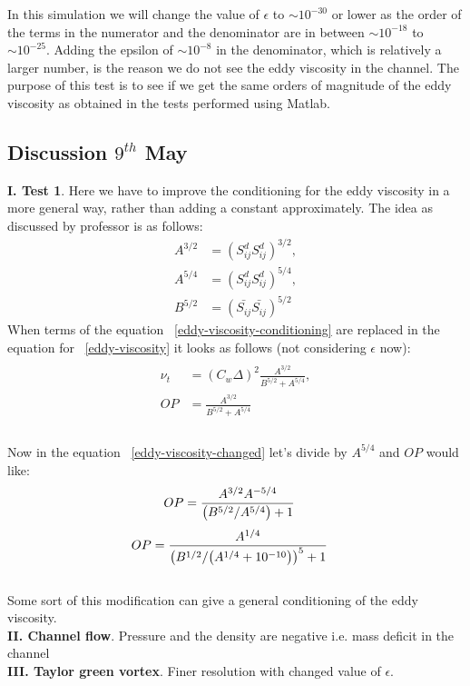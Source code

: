\documentclass[a4paper]{article}
\def\sij{\bar{S_{ij}}}
\begin{document}
In this simulation we will change the value of $\epsilon$ to $\sim 10^{-30}$ or lower as the order of the terms in the numerator and the denominator are in between $\sim 10^{-18}$ to $\sim 10^{-25}$. Adding the epsilon of $\sim 10^{-8}$ in the denominator, which is relatively a larger number, is the reason we do not see the eddy viscosity in the channel. The purpose of this test is to see if we get the same orders of magnitude of the eddy viscosity as obtained in the tests performed using Matlab.
\subsection{Discussion $9^{th}$ May}

{\bf I. Test 1}. Here we have to improve the conditioning for the eddy viscosity in a more general way, rather than adding a constant  approximately. The idea as discussed by professor is as follows:
\begin{equation}
\label{eddy-viscosity-conditioning}
\begin{split}
A^{3/2} &= \left({S_{ij}^{d}}{S_{ij}^{d}}\right)^{3/2},\\
A^{5/4} &= \left({S_{ij}^{d}}{S_{ij}^{d}}\right)^{5/4},\\
B^{5/2} &= \left(\sij \sij\right)^{5/2}
\end{split}
\end{equation}
When terms of the equation ~\ref{eddy-viscosity-conditioning} are replaced in the equation for ~\ref{eddy-viscosity} it looks as follows (not considering $\epsilon$ now):
\begin{equation}
\label{eddy-viscosity-changed}
\begin{split}\\
{\nu_t} &= \left({C_w}{\Delta}\right)^{2}
\frac{A^{3/2}}{B^{5/2} + {A^{5/4}}},\\
{OP} &= \frac{A^{3/2}}{B^{5/2} + {A^{5/4}}}\\
\end{split}
\end{equation}\\
Now in the equation ~\ref{eddy-viscosity-changed} let's divide by ${A^{5/4}}$ and ${OP}$ would like:
\begin{equation}
\begin{split}
{OP} &= \frac{A^{3/2}A^{\--5/4}}{\left(B^{5/2}\// {A^{5/4}}\right) + 1}
\end{split}
\end{equation}
\begin{equation}
\label{some_modification}
\begin{split}
{OP} &= \frac{A^{1/4}}{\left(B^{1/2}\// {\left(A^{1/4} + 10^{-10}\right)}\right)^{5} + 1}
\end{split}
\end{equation}\\
Some sort of this modification can give a general conditioning of the eddy viscosity.\\
{\bf II. Channel flow}.  Pressure and the density are negative i.e. mass deficit in the channel\\
{\bf III. Taylor green vortex}. Finer resolution with changed value of $\epsilon$. 
\end{document}
